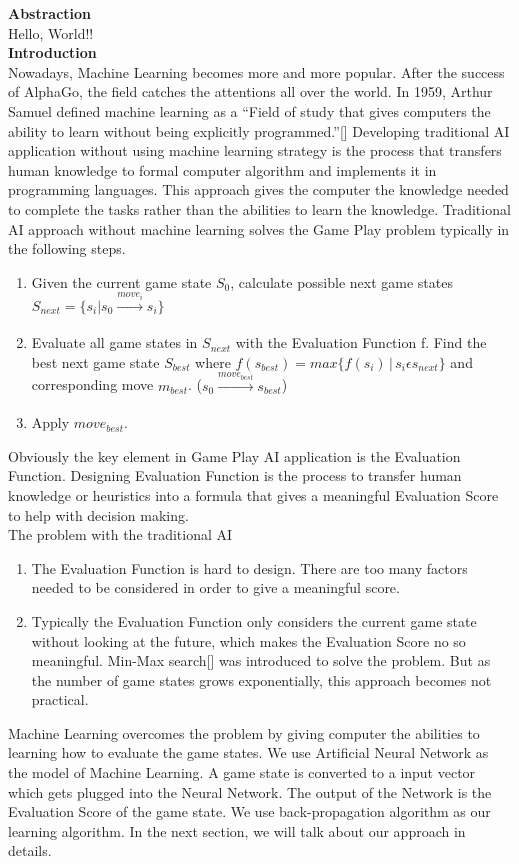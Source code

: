 \documentclass{report}
\begin{document}
	\textbf{Abstraction}\\
		Hello, World!!\\
	\textbf{Introduction}\\
	Nowadays, Machine Learning becomes more and more popular. After the success of AlphaGo, the field catches the attentions all over the world.  In 1959, Arthur Samuel defined machine
	learning as a ``Field of study that gives computers the ability to learn without being explicitly programmed.''[] Developing traditional AI application without using machine learning
	strategy is the process that transfers human knowledge to formal computer algorithm and implements it in programming languages. This approach gives the computer the knowledge needed
	to complete the tasks rather than the abilities to learn the knowledge. Traditional AI approach without machine learning solves the Game Play problem typically in the following steps.
	\begin{enumerate}
		\item Given the current game state $S_0$, calculate possible next game states $S_{next} = \{s_i|s_0\xrightarrow[]{move_i}s_i\}$

		\item Evaluate all game states in $S_{next}$ with the Evaluation Function f. Find the best next game state $S_{best}$ where $f(s_{best}) = max\{f(s_i)\,|\,s_i \epsilon s_{next}\}$ and corresponding
			move $m_{best}$. ($s_0 \xrightarrow[]{move_{best}} s_{best}$)
		\item Apply $move_{best}$.
	\end{enumerate}
	Obviously the key element in Game Play AI application is the Evaluation Function.  Designing Evaluation Function is the process to transfer human knowledge or heuristics into a formula
	that gives a meaningful Evaluation Score to help with decision making.\\
	The problem with the traditional AI
	\begin{enumerate}
		\item The Evaluation Function is hard to design. There are too many factors needed to be considered in order to give a meaningful score. 
		\item Typically the Evaluation Function only considers the current game state without looking at the future, which makes the Evaluation Score no so meaningful.  Min-Max search[]
		was introduced to solve the problem. But as the number of game states grows exponentially, this approach becomes not practical.
	\end{enumerate}
	Machine Learning overcomes the problem by giving computer the abilities to learning how to evaluate the game states. We use Artificial Neural Network as the model of Machine Learning. A
	game state is converted to a input vector which gets plugged into the Neural Network. The output of the Network is the Evaluation Score of the game state. We use back-propagation algorithm
	as our learning algorithm. In the next section, we will talk about our approach in details.\\
\end{document}
